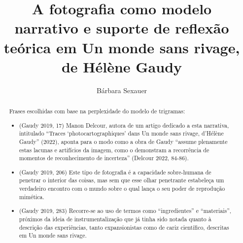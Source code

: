 \documentclass{article}
\title{A fotografia como modelo narrativo e
suporte de reflexão teórica em
Un monde sans rivage, de Hélène Gaudy}
\author{Bárbara Sexauer}
\begin{document}
\maketitle

\begin{abstract}
Frases escolhidas com base na perplexidade do modelo de trigramas:
\begin{itemize}
\item (Gaudy 2019, 17)  Manon Delcour, autora de um artigo dedicado a esta narrativa, intitulado “Traces ‘photocartographiques’ dans Un monde sans rivage, d’Hélène Gaudy” (2022), aponta para o modo como a obra de Gaudy “assume plenamente estas lacunas e artifícios da imagem, como o demonstram a recorrência de momentos de reconhecimento de incerteza” (Delcour 2022, 84-86).
\item (Gaudy 2019, 206)  Este tipo de fotografia é a capacidade sobre-humana de penetrar o interior das coisas, mas sem que esse olhar penetrante estabeleça um verdadeiro encontro com o mundo sobre o qual lança o seu poder de reprodução mimética.
\item (Gaudy 2019, 283)  Recorre-se ao uso de termos como “ingredientes” e “materiais”, próximos da ideia de instrumentalização que já tinha sido notada quanto à descrição das experiências, tanto expansionistas como de cariz científico, descritas em Un monde sans rivage.
 
\end{itemize}
\end{abstract}
\end{document}

